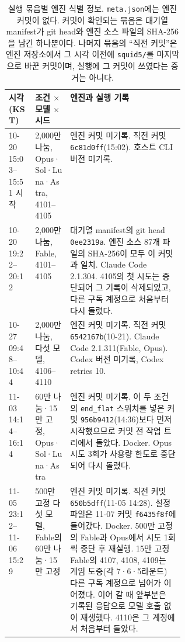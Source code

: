 \begin{table}[H]
\centering
\caption{실행 묶음별 엔진 식별 정보. \texttt{meta.json}에는 엔진 커밋이 없다. 커밋이 확인되는 묶음은 대기열 manifest가 git head와 엔진 소스 파일의 SHA-256을 남긴 하나뿐이다. 나머지 묶음의 ``직전 커밋''은 엔진 저장소에서 그 시각 이전에 \texttt{squid5/}를 마지막으로 바꾼 커밋이며, 실행에 그 커밋이 쓰였다는 증거는 아니다.}
\label{val:w5-tab-batch}
\scriptsize
\renewcommand{\arraystretch}{1.15}
\begin{tabularx}{\linewidth}{@{}p{0.15\linewidth} p{0.2\linewidth} X@{}}
\toprule
시각 (KST) & 조건 $\times$ 모델 $\times$ 시드 & 엔진과 실행 기록 \\
\midrule
10-20 15:03--15:51 시작 & 2,000만 나눔, Opus·Sol·Luna·Astra, 4101--4105 & 엔진 커밋 미기록. 직전 커밋 \texttt{6c81d0ff}(15:02). 호스트 CLI 버전 미기록. \\
10-20 19:22--20:12 & 2,000만 나눔, Fable, 4101--4105 & 대기열 manifest의 git head \texttt{0ee2319a}. 엔진 소스 87개 파일의 SHA-256이 모두 이 커밋과 일치. Claude Code 2.1.304. 4105의 첫 시도는 중단되어 그 기록이 삭제되었고, 다른 구독 계정으로 처음부터 다시 돌렸다. \\
10-27 09:48--10:44 & 2,000만 나눔, 다섯 모델, 4106--4110 & 엔진 커밋 미기록. 직전 커밋 \texttt{6542167b}(10-21). Claude Code 2.1.311(Fable, Opus). Codex 버전 미기록, Codex retries 10. \\
11-03 14:14--16:14 & 60만 나눔·15만 고정, Opus·Sol·Luna·Astra & 엔진 커밋 미기록. 이 두 조건의 \texttt{end\_flat} 스위치를 넣은 커밋 \texttt{956b9412}(14:36)보다 먼저 시작했으므로 커밋 전 작업 트리에서 돌았다. Docker. Opus 시도 3회가 사용량 한도로 중단되어 다시 돌렸다. \\
11-05 23:12--11-06 15:29 & 500만 고정 다섯 모델, Fable의 60만 나눔·15만 고정 & 엔진 커밋 미기록. 직전 커밋 \texttt{650b5dff}(11-05 14:28). 설정 파일은 11-07 커밋 \texttt{f6435f8f}에 들어갔다. Docker. 500만 고정의 Fable과 Opus에서 시도 1회씩 중단 후 재실행. 15만 고정 Fable의 4107, 4108, 4109는 게임 도중(각 7·6·5라운드) 다른 구독 계정으로 넘어가 이어졌다. 이어 갈 때 앞부분은 기록된 응답으로 모델 호출 없이 재생했다. 4110은 그 계정에서 처음부터 돌았다. \\
\bottomrule
\end{tabularx}
\end{table}

